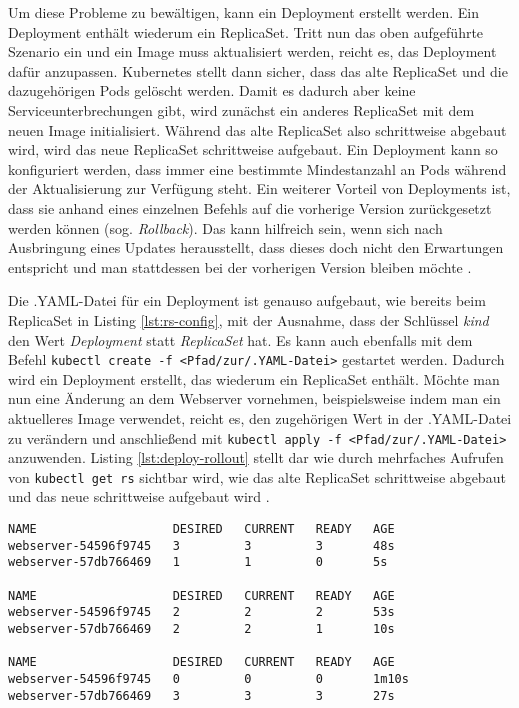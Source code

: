 \documentclass[11pt,a4paper]{article}
\begin{document}
Um diese Probleme zu bewältigen, kann ein Deployment erstellt werden.
Ein Deployment enthält wiederum ein ReplicaSet. Tritt nun das oben aufgeführte Szenario ein und ein Image
muss aktualisiert werden, reicht es, das Deployment dafür anzupassen.
Kubernetes stellt dann sicher, dass das alte ReplicaSet und die dazugehörigen Pods gelöscht werden.
Damit es dadurch aber keine Serviceunterbrechungen gibt, wird zunächst ein anderes ReplicaSet mit dem neuen
Image initialisiert. Während das alte ReplicaSet also schrittweise abgebaut wird, wird das neue ReplicaSet
schrittweise aufgebaut. Ein Deployment kann so konfiguriert werden, dass immer eine bestimmte Mindestanzahl an
Pods während der Aktualisierung zur Verfügung steht.
Ein weiterer Vorteil von Deployments ist, dass sie anhand eines einzelnen Befehls auf die vorherige Version
zurückgesetzt werden können (sog. \emph{Rollback}). Das kann hilfreich sein, wenn sich nach Ausbringung eines
Updates herausstellt, dass dieses doch nicht den Erwartungen entspricht und man stattdessen bei der vorherigen
Version bleiben möchte \cite{Schmeling_Dargatz_2022}.

Die .YAML-Datei für ein Deployment ist genauso aufgebaut, wie bereits beim ReplicaSet in
Listing \ref{lst:rs-config}, mit der Ausnahme, dass der Schlüssel \emph{kind} den Wert
\emph{Deployment} statt \emph{ReplicaSet} hat. Es kann auch ebenfalls mit dem Befehl
\lstinline|kubectl create -f <Pfad/zur/.YAML-Datei>| gestartet werden.
Dadurch wird ein Deployment erstellt, das wiederum ein ReplicaSet enthält.
Möchte man nun eine Änderung an dem Webserver vornehmen, beispielsweise indem
man ein aktuelleres Image verwendet, reicht es, den zugehörigen Wert in der .YAML-Datei
zu verändern und anschließend mit \lstinline|kubectl apply -f <Pfad/zur/.YAML-Datei>| anzuwenden.
Listing \ref{lst:deploy-rollout} stellt dar wie durch mehrfaches Aufrufen
von \lstinline|kubectl get rs| sichtbar wird, wie das alte
ReplicaSet schrittweise abgebaut und das neue schrittweise aufgebaut wird \cite{Schmeling_Dargatz_2022}.

\begin{lstlisting}[caption={Ein Deployment, das schrittweise ein Update ausführt.}, label={lst:deploy-rollout}]
NAME                   DESIRED   CURRENT   READY   AGE
webserver-54596f9745   3         3         3       48s
webserver-57db766469   1         1         0       5s

NAME                   DESIRED   CURRENT   READY   AGE
webserver-54596f9745   2         2         2       53s
webserver-57db766469   2         2         1       10s

NAME                   DESIRED   CURRENT   READY   AGE
webserver-54596f9745   0         0         0       1m10s
webserver-57db766469   3         3         3       27s

\end{lstlisting}
\end{document}
